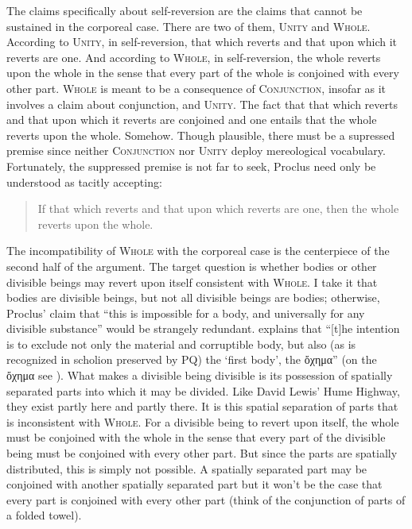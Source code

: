 The claims specifically about self-reversion are the claims that cannot be sustained in the corporeal case. There are two of them, \textsc{Unity} and \textsc{Whole}. According to \textsc{Unity}, in self-reversion, that which reverts and that upon which it reverts are one. And according to \textsc{Whole}, in self-reversion, the whole reverts upon the whole in the sense that every part of the whole is conjoined with every other part. \textsc{Whole} is meant to be a consequence of \textsc{Conjunction}, insofar as it involves a claim about conjunction, and \textsc{Unity}. The fact that that which reverts and that upon which it reverts are conjoined and one entails that the whole reverts upon the whole. Somehow. Though plausible, there must be a supressed premise since neither \textsc{Conjunction} nor \textsc{Unity} deploy mereological vocabulary. Fortunately, the suppressed premise is not far to seek, Proclus need only be understood as tacitly accepting:
\begin{quote}
	If that which reverts and that upon which reverts are one, then the whole reverts upon the whole.
\end{quote}

The incompatibility of \textsc{Whole} with the corporeal case is the centerpiece of the second half of the argument. The target question is whether bodies or other divisible beings may revert upon itself consistent with \textsc{Whole}. I take it that bodies are divisible beings, but not all divisible beings are bodies; otherwise, Proclus' claim that ``this is impossible for a body, and universally for any divisible substance'' would be strangely redundant. \citet[203]{Dodds:1963ul} explains that ``[t]he intention is to exclude not only the material and corruptible body, but also (as is recognized in scholion preserved by PQ) the `first body', the {\sbl ὄχημα}'' (on the {\sbl ὄχημα} see \citealt[appendix 2]{Dodds:1963ul}). What makes a divisible being divisible is its possession of spatially separated parts into which it may be divided. Like David Lewis' Hume Highway, they exist partly here and partly there. It is this spatial separation of parts that is inconsistent with \textsc{Whole}. For a divisible being to revert upon itself, the whole must be conjoined with the whole in the sense that every part of the divisible being must be conjoined with every other part. But since the parts are spatially distributed, this is simply not possible. A spatially separated part may be conjoined with another spatially separated part but it won't be the case that every part is conjoined with every other part (think of the conjunction of parts of a folded towel).

